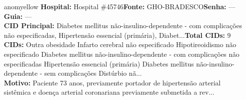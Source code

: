 \documentclass[a4paper,10pt]{article}
\begin{document}
\begin{anomalycard}[Interna\c{c}\~{a}o \#118792 | Pac. \#98537 | MODERADO (z=2.02) | LOS: 5d | 25/02/2026\,$\to$\,02/03/2026]{anomyellow}
\textbf{Hospital:} Hospital \#45746\quad \textbf{Fonte:} GHO-BRADESCO\quad \textbf{Senha:} ---\quad \textbf{Guia:} ---\\

\textbf{CID Principal:} {\small Diabetes mellitus não-insulino-dependente - com complicações não especificadas, Hipertensão essencial (primária), Diabet...}\quad\textbf{Total CIDs:} 9\\

\textbf{CIDs:} {\scriptsize Outra obesidade \textbar{} Infarto cerebral não especificado \textbar{} Hipotireoidismo não especificado \textbar{} Diabetes mellitus não-insulino-dependente - com complicações não especificadas \textbar{} Hipertensão essencial (primária) \textbar{} Diabetes mellitus não-insulino-dependente - sem complicações \textbar{} Distúrbio nã...}\\

\textbf{Motivo:} {\scriptsize Paciente 73 anos, previamente portador de hipertensão arterial sistêmica e doença arterial coronariana previamente submetida a rev...}\\



\end{anomalycard}
\end{document}

